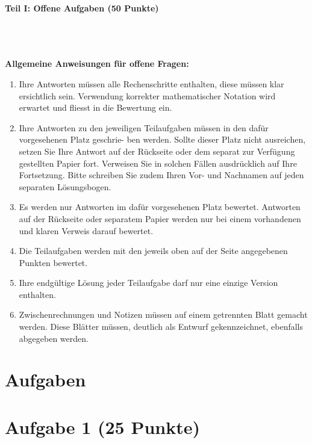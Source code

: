 \begin{Large}
\textbf{Teil I: Offene Aufgaben (50 Punkte)}
\end{Large}
\\
\\
\\
\textbf{Allgemeine Anweisungen für offene Fragen:}
\\
\renewcommand{\labelenumi}{(\roman{enumi})}
\begin{enumerate}
\item
Ihre Antworten müssen alle Rechenschritte enthalten,
diese müssen klar ersichtlich sein.
Verwendung korrekter mathematischer Notation wird erwartet
und fliesst in die Bewertung ein.

\item
Ihre Antworten zu den jeweiligen Teilaufgaben müssen in den dafür vorgesehenen Platz geschrie-
ben werden. Sollte dieser Platz nicht ausreichen, setzen Sie Ihre Antwort auf der Rückseite oder
dem separat zur Verfügung gestellten Papier fort. Verweisen Sie in solchen Fällen ausdrücklich
auf Ihre Fortsetzung. Bitte schreiben Sie zudem Ihren Vor- und Nachnamen auf jeden separaten
Lösungsbogen.

\item
Es werden nur Antworten im dafür vorgesehenen Platz bewertet. Antworten auf der Rückseite
oder separatem Papier werden nur bei einem vorhandenen und klaren Verweis darauf bewertet.

\item
Die Teilaufgaben werden mit den jeweils oben auf der Seite angegebenen Punkten bewertet.

\item
Ihre endgültige Lösung jeder Teilaufgabe darf nur eine einzige Version enthalten.

\item
Zwischenrechnungen und Notizen müssen auf einem getrennten Blatt gemacht werden. Diese
Blätter müssen, deutlich als Entwurf gekennzeichnet, ebenfalls abgegeben werden.
\end{enumerate}

\newpage
\section*{\hfil Aufgaben \hfil}
\vspace{1cm}
\section*{Aufgabe 1 (25 Punkte)}
\vspace{0.4cm}
